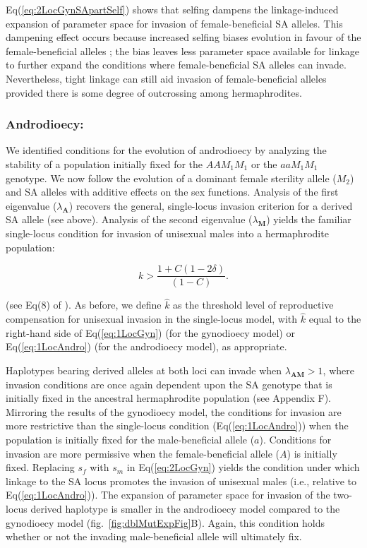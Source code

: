 \documentclass{article}
\begin{document}
\noindent Eq(\ref{eq:2LocGynSApartSelf}) shows that selfing dampens the linkage-induced expansion of parameter space for invasion of female-beneficial SA alleles. This dampening effect occurs because increased selfing biases evolution in favour of the female-beneficial alleles \citep{Olito2017}; the bias leaves less parameter space available for linkage to further expand the conditions where female-beneficial SA alleles can invade. Nevertheless, tight linkage can still aid invasion of female-beneficial alleles provided there is some degree of outcrossing among hermaphrodites. 


\subsubsection*{Androdioecy:} We identified conditions for the evolution of androdioecy by analyzing the stability of a population initially fixed for the $AAM_1M_1$ or the $aaM_1M_1$ genotype. We now follow the evolution of a dominant female sterility allele ($M_2$) and SA alleles with additive effects on the sex functions. Analysis of the first eigenvalue ($\lambda_{\mathbf{A}}$) recovers the general, single-locus invasion criterion for a derived SA allele (see above). Analysis of the second eigenvalue ($\lambda_{\mathbf{M}}$) yields the familiar single-locus condition for invasion of unisexual males into a hermaphrodite population:

\begin{equation}\label{eq:1LocAndro}
	k > \frac{1 + C (1 - 2 \delta)}{(1 - C)}.
\end{equation}

\noindent (see Eq(8) of \citealt{Charlesworth1978a}). As before, we define $\hat{k}$ as the threshold level of reproductive compensation for unisexual invasion in the single-locus model, with $\hat{k}$ equal to the right-hand side of Eq(\ref{eq:1LocGyn}) (for the gynodioecy model) or Eq(\ref{eq:1LocAndro}) (for the androdioecy model), as appropriate.

Haplotypes bearing derived alleles at both loci can invade when $\lambda_{\mathbf{AM}} > 1$, where invasion conditions are once again dependent upon the SA genotype that is initially fixed in the ancestral hermaphrodite population (see Appendix F). Mirroring the results of the gynodioecy model, the conditions for invasion are more restrictive than the single-locus condition (Eq(\ref{eq:1LocAndro})) when the population is initially fixed for the male-beneficial allele ($a$). Conditions for invasion are more permissive when the female-beneficial allele ($A$) is initially fixed. Replacing $s_f$ with $s_m$ in Eq(\ref{eq:2LocGyn}) yields the condition under which linkage to the SA locus promotes the invasion of unisexual males (i.e., relative to Eq(\ref{eq:1LocAndro})). The expansion of parameter space for invasion of the two-locus derived haplotype is smaller in the androdioecy model compared to the gynodioecy model (fig.~\ref{fig:dblMutExpFig}B). Again, this condition holds whether or not the invading male-beneficial allele will ultimately fix.
\end{document}
